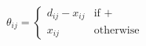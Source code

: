\documentclass[preview]{standalone}
\begin{document}
\begin{center}
$\theta_{ij} = \left\{\begin{array}{ll} d_{ij} - x_{ij} & \text{if } + \\ x_{ij} & \text{otherwise} \end{array} \right.$
\end{center}
\end{document}
